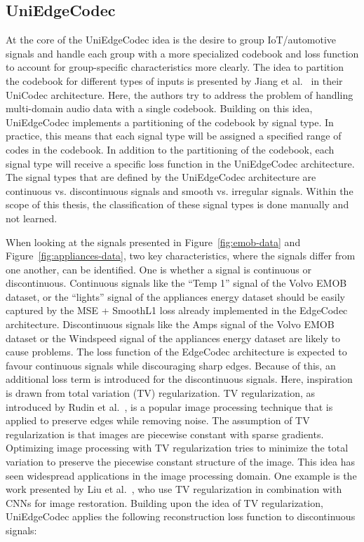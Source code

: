 \subsection{UniEdgeCodec}

At the core of the UniEdgeCodec idea is the desire to group IoT/automotive signals and handle each group with a more specialized codebook and loss function to account for group-specific characteristics more clearly. The idea to partition the codebook for different types of inputs is presented by Jiang et al.~\cite{Jiang2025} in their UniCodec architecture. Here, the authors try to address the problem of handling multi-domain audio data with a single codebook. Building on this idea, UniEdgeCodec implements a partitioning of the codebook by signal type. In practice, this means that each signal type will be assigned a specified range of codes in the codebook. In addition to the partitioning of the codebook, each signal type will receive a specific loss function in the UniEdgeCodec architecture. The signal types that are defined by the UniEdgeCodec architecture are continuous vs. discontinuous signals and smooth vs. irregular signals. Within the scope of this thesis, the classification of these signal types is done manually and not learned. 

When looking at the signals presented in Figure~\ref{fig:emob-data} and Figure~\ref{fig:appliances-data}, two key characteristics, where the signals differ from one another, can be identified. One is whether a signal is continuous or discontinuous. Continuous signals like the ``Temp 1'' signal of the Volvo EMOB dataset, or the ``lights'' signal of the appliances energy dataset should be easily captured by the MSE + SmoothL1 loss already implemented in the EdgeCodec architecture. Discontinuous signals like the Amps signal of the Volvo EMOB dataset or the Windspeed signal of the appliances energy dataset are likely to cause problems. The loss function of the EdgeCodec architecture is expected to favour continuous signals while discouraging sharp edges. Because of this, an additional loss term is introduced for the discontinuous signals. Here, inspiration is drawn from total variation (TV) regularization. TV regularization, as introduced by Rudin et al.~\cite{Rudin1992}, is a popular image processing technique that is applied to preserve edges while removing noise. The assumption of TV regularization is that images are piecewise constant with sparse gradients. Optimizing image processing with TV regularization tries to minimize the total variation to preserve the piecewise constant structure of the image. This idea has seen widespread applications in the image processing domain. One example is the work presented by Liu et al.~\cite{Liu2018}, who use TV regularization in combination with CNNs for image restoration. Building upon the idea of TV regularization, UniEdgeCodec applies the following reconstruction loss function to discontinuous signals: 

